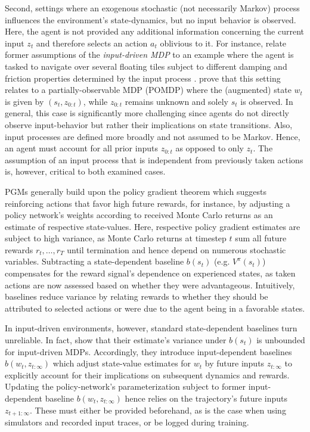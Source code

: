 Second, settings where an exogenous stochastic (not necessarily Markov) process influences the environment's state-dynamics, but no input behavior is observed. Here, the agent is not provided any additional information concerning the current input $z_t$ and therefore selects an action $a_t$ oblivious to it. For instance, \citeauthor{mao2018variance} relate former assumptions of the \textit{input-driven MDP} to an example where the agent is tasked to navigate over several floating tiles subject to different damping and friction properties determined by the input process \cite{clavera2018learning}. \citeauthor{mao2018variance} prove that this setting relates to a partially-observable MDP (POMDP) where the (augmented) state $w_t$ is given by $(s_t, z_{0:t})$, while $z_{0:t}$ remains unknown and solely $s_t$ is observed. In general, this case is significantly more challenging since agents do not directly observe input-behavior but rather their implications on state transitions. Also, input processes are defined more broadly and not assumed to be Markov. Hence, an agent must account for all prior inputs $z_{0:t}$ as opposed to only $z_t$. The assumption of an input process that is independent from previously taken actions is, however, critical to both examined cases.

PGMs generally build upon the policy gradient theorem \cite{sutton2000policy} which suggests reinforcing actions that favor high future rewards, for instance, by adjusting a policy network's weights according to received Monte Carlo returns as an estimate of respective state-values. Here, respective policy gradient estimates are subject to high variance, as Monte Carlo returns at timestep $t$ sum all future rewards $r_t, \dots, r_T$ until termination and hence depend on numerous stochastic variables. Subtracting a state-dependent baseline $b(s_t)$ (e.g. $V^{\pi}(s_t)$) compensates for the reward signal's dependence on experienced states, as taken actions are now assessed based on whether they were advantageous. Intuitively, baselines reduce variance by relating rewards to whether they should be attributed to selected actions or were due to the agent being in a favorable states.

In input-driven environments, however, standard state-dependent baselines turn unreliable. In fact, \citeauthor{mao2018variance} show that their estimate's variance under $b(s_t)$ is unbounded for input-driven MDPs. Accordingly, they introduce input-dependent baselines $b(w_t, z_{t:\infty})$ which adjust state-value estimates for $w_t$ by future inputs $z_{t:\infty}$ to explicitly account for their implications on subsequent dynamics and rewards. Updating the policy-network's parameterization subject to former input-dependent baseline $b(w_t, z_{t:\infty})$ hence relies on the trajectory's future inputs $z_{t+1:\infty}$. These must either be provided beforehand, as is the case when using simulators and recorded input traces, or be logged during training.


